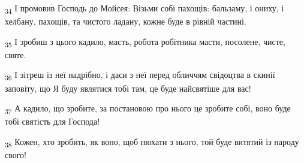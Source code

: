 \begin{tcolorbox}
\textsubscript{34} І промовив Господь до Мойсея: Візьми собі пахощів: бальзаму, і ониху, і хелбану, пахощів, та чистого ладану, кожне буде в рівній частині.
\end{tcolorbox}
\begin{tcolorbox}
\textsubscript{35} І зробиш з цього кадило, масть, робота робітника масти, посолене, чисте, святе.
\end{tcolorbox}
\begin{tcolorbox}
\textsubscript{36} І зітреш із неї надрібно, і даси з неї перед обличчям свідоцтва в скинії заповіту, що Я буду являтися тобі там, це буде найсвятіше для вас!
\end{tcolorbox}
\begin{tcolorbox}
\textsubscript{37} А кадило, що зробите, за постановою про нього це зробите собі, воно буде тобі святість для Господа!
\end{tcolorbox}
\begin{tcolorbox}
\textsubscript{38} Кожен, хто зробить, як воно, щоб нюхати з нього, той буде витятий із народу свого!
\end{tcolorbox}
